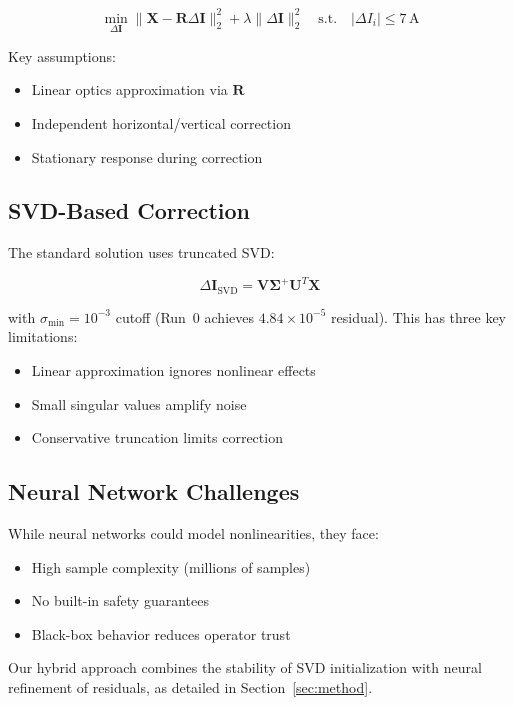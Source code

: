 \documentclass{article} %
\begin{document}
\begin{equation}
    \min_{\Delta \mathbf{I}} \|\mathbf{X} - \mathbf{R}\Delta\mathbf{I}\|^2_2 + \lambda\|\Delta\mathbf{I}\|^2_2 \quad \text{s.t.} \quad |\Delta I_i| \leq 7\,\text{A}
    \label{eq:orbit_correction}
\end{equation}

Key assumptions:
\begin{itemize}
    \item Linear optics approximation via $\mathbf{R}$
    \item Independent horizontal/vertical correction
    \item Stationary response during correction
\end{itemize}

\subsection{SVD-Based Correction}
The standard solution uses truncated SVD:

\begin{equation}
    \Delta\mathbf{I}_{\text{SVD}} = \mathbf{V}\mathbf{\Sigma}^+\mathbf{U}^T\mathbf{X}
    \label{eq:svd_correction}
\end{equation}

with $\sigma_{\text{min}}=10^{-3}$ cutoff (Run~0 achieves $4.84 \times 10^{-5}$ residual). This has three key limitations:
\begin{itemize}
    \item Linear approximation ignores nonlinear effects
    \item Small singular values amplify noise
    \item Conservative truncation limits correction
\end{itemize}

\subsection{Neural Network Challenges}
While neural networks could model nonlinearities, they face:
\begin{itemize}
    \item High sample complexity (millions of samples)
    \item No built-in safety guarantees
    \item Black-box behavior reduces operator trust
\end{itemize}

Our hybrid approach combines the stability of SVD initialization with neural refinement of residuals, as detailed in Section~\ref{sec:method}.
\end{document}
